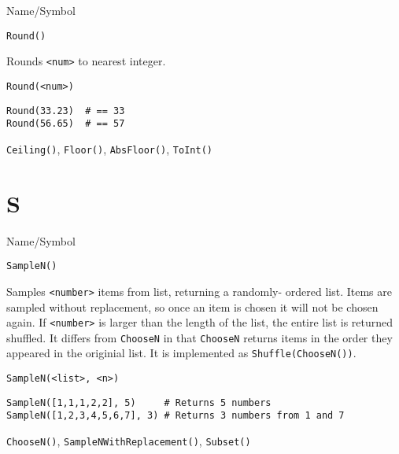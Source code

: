 \rl



\begin{desc}{Name/Symbol}
\item[Name/Symbol] 	\verb+Round()+

\item[Description] 	Rounds \verb+<num>+ to nearest integer.

\item[Usage]        	
\begin{verbatim}
Round(<num>)
\end{verbatim}

\item[Example]
\begin{verbatim}
Round(33.23)  # == 33
Round(56.65)  # == 57
\end{verbatim}

\item[See Also]     	\verb+Ceiling()+, \verb+Floor()+, \verb+AbsFloor()+, \verb+ToInt()+
\end{desc}

\rl

\section{S}
\rl

\begin{desc}{Name/Symbol}
\item[Name/Symbol]  	\verb+SampleN()+

\item[Description] Samples \verb+<number>+ items from list, returning
  a randomly- ordered list. Items are sampled without replacement, so
  once an item is chosen it will not be chosen again. If
  \verb+<number>+ is larger than the length of the list, the entire
  list is returned shuffled.  It differs from \verb+ChooseN+ in that
  \verb+ChooseN+ returns items in the order they appeared in the
  originial list.  It is implemented as \verb+Shuffle(ChooseN())+.

\item[Usage]       	
\begin{verbatim}
SampleN(<list>, <n>)
\end{verbatim}

\item[Example]   	
\begin{verbatim}
SampleN([1,1,1,2,2], 5)     # Returns 5 numbers
SampleN([1,2,3,4,5,6,7], 3) # Returns 3 numbers from 1 and 7
\end{verbatim}

\item[See Also]    	\verb+ChooseN()+, \verb+SampleNWithReplacement()+, \verb+Subset()+
\end{desc}

